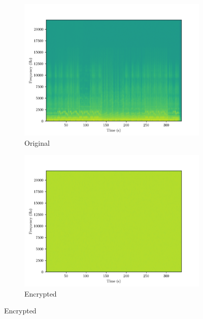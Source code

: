 \documentclass[a4paper]{cas-sc}
\begin{document}
\begin{figure}[pos=h]
    \begin{subfigure}[h]{0.3\textwidth}
        \begin{center}
            \includegraphics[width=\textwidth]{embedded2Spectrogram.png}
            \caption{Original}
            \label{fig:embedded2Spectrogram}
        \end{center}
    \end{subfigure}
    \begin{subfigure}[h]{0.3\textwidth}
        \begin{center}
            \includegraphics[width=\textwidth]{encrypted2Spectrogram.png}
            \caption{Encrypted}
            \label{fig:encrypted2Spectrogram}

\end{center}
\end{subfigure}
\end{figure}
\end{document}

